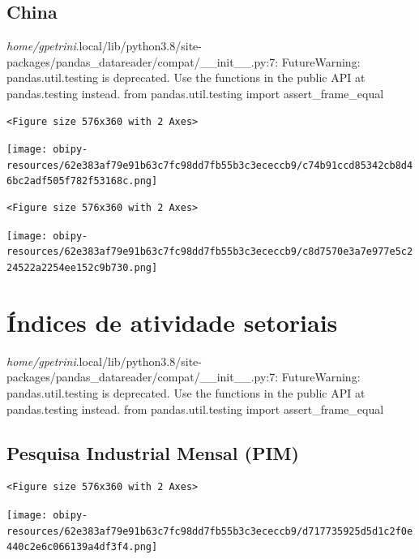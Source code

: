 \documentclass[11pt]{article}
\begin{document}
\subsection{China}
\label{sec:orgd808720}

\emph{home/gpetrini}.local/lib/python3.8/site-packages/pandas\_datareader/compat/\_\_init\_\_.py:7: FutureWarning: pandas.util.testing is deprecated. Use the functions in the public API at pandas.testing instead.
  from pandas.util.testing import assert\_frame\_equal


\begin{verbatim}
<Figure size 576x360 with 2 Axes>
\end{verbatim}


\begin{center}
\texttt{[image: obipy-resources/62e383af79e91b63c7fc98dd7fb55b3c3ececcb9/c74b91ccd85342cb8d46bc2adf505f782f53168c.png]}
\end{center}

\begin{verbatim}
<Figure size 576x360 with 2 Axes>
\end{verbatim}


\begin{center}
\texttt{[image: obipy-resources/62e383af79e91b63c7fc98dd7fb55b3c3ececcb9/c8d7570e3a7e977e5c224522a2254ee152c9b730.png]}
\end{center}



\section{Índices de atividade setoriais}
\label{sec:org5f57953}

\emph{home/gpetrini}.local/lib/python3.8/site-packages/pandas\_datareader/compat/\_\_init\_\_.py:7: FutureWarning: pandas.util.testing is deprecated. Use the functions in the public API at pandas.testing instead.
  from pandas.util.testing import assert\_frame\_equal


\subsection{Pesquisa Industrial Mensal (PIM)}
\label{sec:orgd24c7b9}

\begin{verbatim}
<Figure size 576x360 with 2 Axes>
\end{verbatim}


\begin{center}
\texttt{[image: obipy-resources/62e383af79e91b63c7fc98dd7fb55b3c3ececcb9/d717735925d5d1c2f0e440c2e6c066139a4df3f4.png]}
\end{center}
\end{document}
